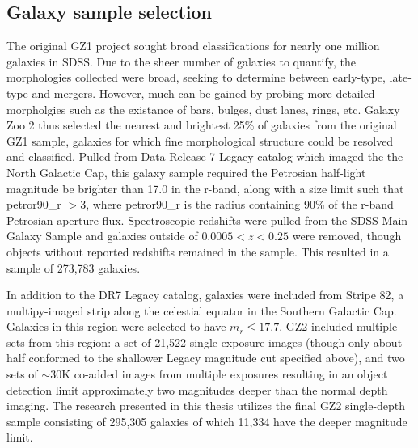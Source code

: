 \subsection{Galaxy sample selection}
The original GZ1 project sought broad classifications for nearly one million galaxies in SDSS. Due to the sheer number of galaxies to quantify, the morphologies collected were broad, seeking to determine between early-type, late-type and mergers. However, much can be gained by probing more detailed morpholgies such as the existance of bars, bulges, dust lanes, rings, etc. Galaxy Zoo 2 thus selected the nearest and brightest 25\% of galaxies from the original GZ1 sample, galaxies for which fine morphological structure could be resolved and classified. Pulled from Data Release 7 Legacy catalog \cite{Abazajian2009} which imaged the the North Galactic Cap, this galaxy sample required the Petrosian half-light magnitude be brighter than 17.0 in the r-band, along with a size limit such that petror90\_r $>3$, where petror90\_r is the radius containing 90\% of the r-band Petrosian aperture flux. Spectroscopic redshifts were pulled from the SDSS Main Galaxy Sample \cite{Strauss2002} and galaxies outside of $0.0005 < z < 0.25$ were removed, though objects without reported redshifts remained in the sample. This resulted in a sample of 273,783 galaxies. 

In addition to the DR7 Legacy catalog, galaxies were included from Stripe 82, a multipy-imaged strip along the celestial equator in the Southern Galactic Cap. Galaxies in this region were selected to have $m_r\le17.7$. GZ2 included multiple sets from this region: a set of 21,522 single-exposure images (though only about half conformed to the shallower Legacy magnitude cut specified above), and two sets of $\sim$30K co-added images from multiple exposures resulting in an object detection limit approximately two magnitudes deeper than the normal depth imaging. The research presented in this thesis utilizes the final GZ2 single-depth sample consisting of 295,305 galaxies of which 11,334 have the deeper magnitude limit. 


